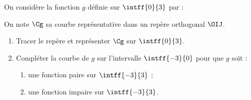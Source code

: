 \begin{exo}{}
	On considère la fonction $g$ définie sur $\intff{0}{3}$ par : 

	On note $\Cg$ sa courbe représentative dans un repère orthogonal $\OIJ$.

	\begin{enumerate}
		\item Tracer le repère et représenter $\Cg$ sur $\intff{0}{3}$.
		\item Compléter la courbe de $g$ sur l'intervalle $\intff{-3}{0}$ pour que $g$ soit :
		      \begin{enumerate}
			      \item une fonction paire sur $\intff{-3}{3}$ ;
			      \item une fonction impaire sur $\intff{-3}{3}$.
		      \end{enumerate}
	\end{enumerate}
\end{exo}
